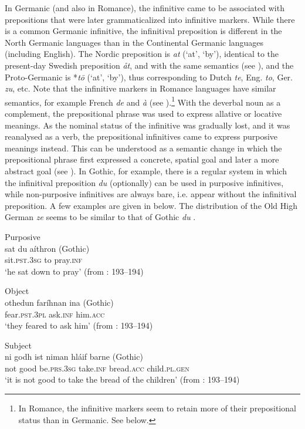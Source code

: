 \documentclass[output=paper]{langscibook}
\begin{document}
In Germanic (and also in Romance), the infinitive came to be associated with prepositions that were later grammaticalized into infinitive markers. While there is a common Germanic infinitive, the infinitival preposition is different in the North Germanic languages than in the Continental Germanic languages (including English). The Nordic preposition is \textit{at} (‘at’, ‘by’), identical to the present-day Swedish preposition \textit{åt}, and with the same semantics (see \citealt{Hellquist1948}), and the Proto-Germanic is *\textit{tō} (‘at’, ‘by’), thus corresponding to Dutch \textit{te}, Eng. \textit{to}, Ger. \textit{zu}, etc. Note that the infinitive markers in Romance languages have similar semantics, for example French \textit{de} and \textit{à} (see \citealt[15]{Beckman1934}).\footnote{In Romance, the infinitive markers seem to retain more of their prepositional status than in Germanic. See  below.}  With the deverbal noun as a complement, the prepositional phrase was used to express allative or locative meanings. As the nominal status of the infinitive was gradually lost, and it was reanalysed as a verb, the prepositional infinitives came to express purposive meanings instead. This can be understood as a semantic change in which the prepositional phrase first expressed a concrete, spatial goal and later a more abstract goal (see \citealt{Los2005}). In Gothic, for example, there is a regular system in which the infinitival preposition \textit{du} (optionally) can be used in purposive infinitives, while non-purposive infinitives are always bare, i.e. appear without the infinitival preposition. A few examples are given in  below. The distribution of the Old High German \textit{ze} seems to be similar to that of Gothic \textit{du} \citep{Haspelmath1989}. 

\ea
\label{ex:kalm:3}
\ea Purposive\\\label{ex:kalm:3a}
\gll sat du aíthron (Gothic)\\
sit.\textsc{pst.3sg} to pray.\textsc{inf}\\
\glt ‘he sat down to pray’ (from \citealt{Wright1954}: 193–194) 

\ex Object\\\label{ex:kalm:3b}
\gll othedun faríhnan ina (Gothic)\\
fear\textsc{.pst.3pl} ask.\textsc{inf} him.\textsc{acc}\\
\glt ‘they feared to ask him’ (from \citealt{Wright1954}: 193–194)

\ex Subject\\ \label{ex:kalm:3c}
\gll ni godh ist niman hláif barne (Gothic)\\
not good be.\textsc{prs.3sg} take.\textsc{inf} bread.\textsc{acc} child.\textsc{pl.gen}\\
\glt‘it is not good to take the bread of the children’ (from \citealt{Wright1954}: 193–194)
\z
\z
\end{document}
